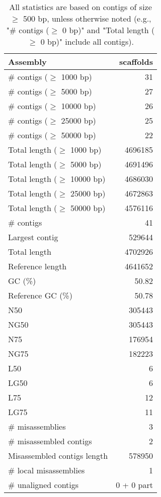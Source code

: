 \documentclass[12pt,a4paper]{article}
\begin{document}
\begin{table}[ht]
\begin{center}
\caption{All statistics are based on contigs of size $\geq$ 500 bp, unless otherwise noted (e.g., "\# contigs ($\geq$ 0 bp)" and "Total length ($\geq$ 0 bp)" include all contigs).}
\begin{tabular}{|l*{1}{|r}|}
\hline
Assembly & scaffolds \\ \hline
\# contigs ($\geq$ 1000 bp) & 31 \\ \hline
\# contigs ($\geq$ 5000 bp) & 27 \\ \hline
\# contigs ($\geq$ 10000 bp) & 26 \\ \hline
\# contigs ($\geq$ 25000 bp) & 25 \\ \hline
\# contigs ($\geq$ 50000 bp) & 22 \\ \hline
Total length ($\geq$ 1000 bp) & 4696185 \\ \hline
Total length ($\geq$ 5000 bp) & 4691496 \\ \hline
Total length ($\geq$ 10000 bp) & 4686030 \\ \hline
Total length ($\geq$ 25000 bp) & 4672863 \\ \hline
Total length ($\geq$ 50000 bp) & 4576116 \\ \hline
\# contigs & 41 \\ \hline
Largest contig & 529644 \\ \hline
Total length & 4702926 \\ \hline
Reference length & 4641652 \\ \hline
GC (\%) & 50.82 \\ \hline
Reference GC (\%) & 50.78 \\ \hline
N50 & 305443 \\ \hline
NG50 & 305443 \\ \hline
N75 & 176954 \\ \hline
NG75 & 182223 \\ \hline
L50 & 6 \\ \hline
LG50 & 6 \\ \hline
L75 & 12 \\ \hline
LG75 & 11 \\ \hline
\# misassemblies & 3 \\ \hline
\# misassembled contigs & 2 \\ \hline
Misassembled contigs length & 578950 \\ \hline
\# local misassemblies & 1 \\ \hline
\# unaligned contigs & 0 + 0 part \\ \hline

\end{tabular}
\end{center}
\end{table}
\end{document}
